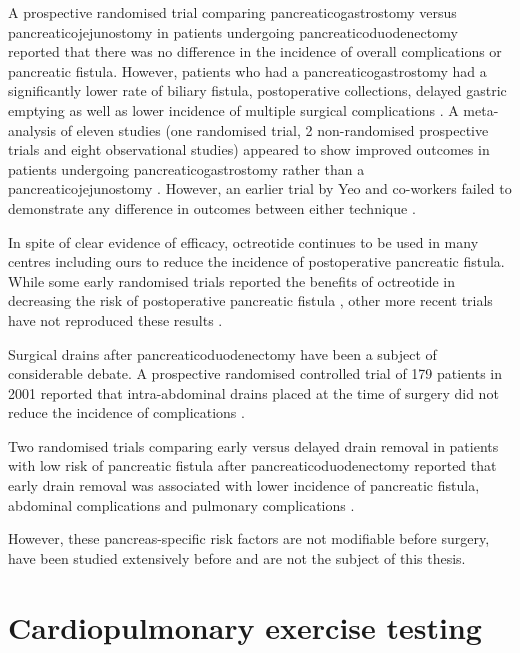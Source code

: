 A prospective randomised trial comparing pancreaticogastrostomy versus pancreaticojejunostomy in patients undergoing pancreaticoduodenectomy reported that there was no difference in the incidence of overall complications or pancreatic fistula. 
However, patients who had a pancreaticogastrostomy had a significantly lower rate of biliary fistula, postoperative collections, delayed gastric emptying as well as lower incidence of multiple surgical complications \parencite{bassi_reconstruction_2005}. 
A meta-analysis of eleven studies (one randomised trial, 2 non-randomised prospective trials and eight observational studies) appeared to show improved outcomes in patients undergoing pancreaticogastrostomy rather than a pancreaticojejunostomy \parencite{mckay_meta-analysis_2006}. 
However, an earlier trial by Yeo and co-workers failed to demonstrate any difference in outcomes between either technique \parencite{yeo_prospective_1995}.

In spite of clear evidence of efficacy, octreotide continues to be used in many centres including ours to reduce the incidence of postoperative pancreatic fistula. 
While some early randomised trials reported the benefits of octreotide in decreasing the risk of postoperative pancreatic fistula \parencite{montorsi_efficacy_1995,nakatsuka_octreotide_2000}, other more recent trials have not reproduced these results \parencite{lowy_prospective_1997, yeo_does_2000, kollmar_prophylactic_2008}. 

Surgical drains after pancreaticoduodenectomy have been a subject of considerable debate. 
A prospective randomised controlled trial of 179 patients in 2001 reported that intra-abdominal drains placed at the time of surgery did not reduce the incidence of complications \parencite{conlon_prospective_2001}.

Two randomised trials comparing early versus delayed drain removal in patients with low risk of pancreatic fistula after pancreaticoduodenectomy reported that early drain removal was associated with lower incidence of pancreatic fistula, abdominal complications and pulmonary complications \parencite{kawai_early_2006,bassi_early_2010}. 

However, these pancreas-specific risk factors are not modifiable before surgery, have been studied extensively before and are not the subject of this thesis.

\section{Cardiopulmonary exercise testing}

